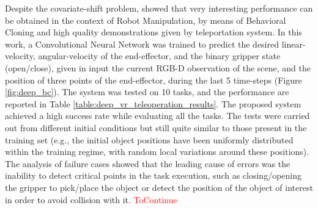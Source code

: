 Despite the covariate-shift problem, \cite{zhang2018deep_vr_teleoperation} showed that very interesting performance can be obtained in the context of Robot Manipulation, by means of Behavioral Cloning and high quality demonstrations given by teleportation system. In this work, a Convolutional Neural Network was trained to predict the desired linear-velocity, angular-velocity of the end-effector, and the binary gripper state (open/close), given in input the current RGB-D observation of the scene, and the position of three points of the end-effector, during the last 5 time-steps (Figure \ref{fig:deep_bc}). The system was tested on 10 tasks, and the performance are reported in Table \ref{table:deep_vr_teleoperation_results}. The proposed system achieved a high success rate while evaluating all the tasks. The tests were carried out from different initial conditions but still quite similar to those present in the training set (e.g., the initial object positions have been uniformly distributed within the training regime, with random local variations around these positions). The analysis of failure cases showed that the leading cause of errors was the inability to detect critical points in the task execution, such as closing/opening the gripper to pick/place the object or detect the position of the object of interest in order to avoid collision with it.
\textcolor{red}{ToContinue} 

